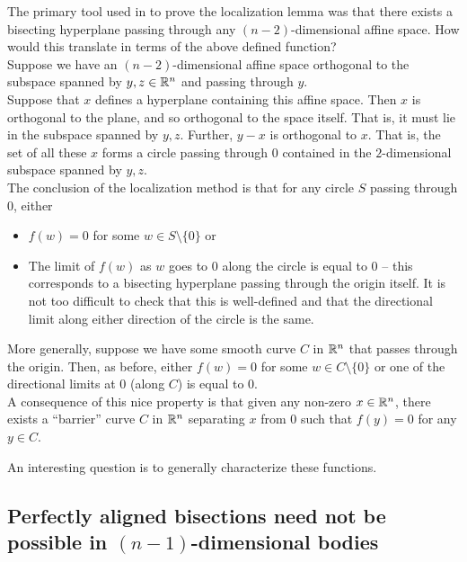 \documentclass{article}
\begin{document}
		The primary tool used in \cite{lov-sim-on7} to prove the localization lemma was that there exists a bisecting hyperplane passing through any $(n-2)$-dimensional affine space. How would this translate in terms of the above defined function?\\
		Suppose we have an $(n-2)$-dimensional affine space orthogonal to the subspace spanned by $y,z\in\mathbb{R}^n$ and passing through $y$.\\
		Suppose that $x$ defines a hyperplane containing this affine space. Then $x$ is orthogonal to the plane, and so orthogonal to the space itself. That is, it must lie in the subspace spanned by $y, z$. Further, $y-x$ is orthogonal to $x$. That is, the set of all these $x$ forms a circle passing through $0$ contained in the $2$-dimensional subspace spanned by $y,z$.\\
		The conclusion of the localization method is that for any circle $S$ passing through $0$, either
		\begin{itemize}
			\item $f(w) = 0$ for some $w \in S \setminus \{0\}$ or
			\item The limit of $f(w)$ as $w$ goes to $0$ along the circle is equal to $0$ -- this corresponds to a bisecting hyperplane passing through the origin itself. It is not too difficult to check that this is well-defined and that the directional limit along either direction of the circle is the same. 
		\end{itemize}

		More generally, suppose we have some smooth curve $C$ in $\mathbb{R}^n$ that passes through the origin. Then, as before, either $f(w) = 0$ for some $w \in C \setminus \{0\}$ or one of the directional limits at $0$ (along $C$) is equal to $0$.\\

		A consequence of this nice property is that given any non-zero $x \in \mathbb{R}^n$, there exists a ``barrier'' curve $C$ in $\mathbb{R}^n$ separating $x$ from $0$ such that $f(y) = 0$ for any $y \in C$.

		An interesting question is to generally characterize these functions.

	\subsection{Perfectly aligned bisections need not be possible in \texorpdfstring{$(n-1)$}{(n-1)}-dimensional bodies}
\end{document}
